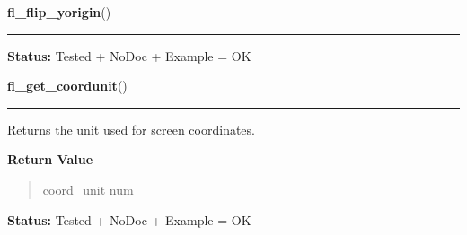     \vspace{0.5ex}

\hspace{.8\funcindent}\begin{boxedminipage}{\funcwidth}

    \raggedright \textbf{fl\_flip\_yorigin}()

    \vspace{-1.5ex}

    \rule{\textwidth}{0.5\fboxrule}
\setlength{\parskip}{2ex}
\setlength{\parskip}{1ex}
\textbf{Status:} Tested + NoDoc + Example = OK



    \end{boxedminipage}

    \label{xformslib:library:fl_get_coordunit}

    \vspace{0.5ex}

\hspace{.8\funcindent}\begin{boxedminipage}{\funcwidth}

    \raggedright \textbf{fl\_get\_coordunit}()

    \vspace{-1.5ex}

    \rule{\textwidth}{0.5\fboxrule}
\setlength{\parskip}{2ex}
    Returns the unit used for screen coordinates.

\setlength{\parskip}{1ex}
      \textbf{Return Value}
    \vspace{-1ex}

      \begin{quote}
      coord\_unit num

      \end{quote}

\textbf{Status:} Tested + NoDoc + Example = OK



    \end{boxedminipage}

    \label{xformslib:library:fl_get_border_width}

    \vspace{0.5ex}

